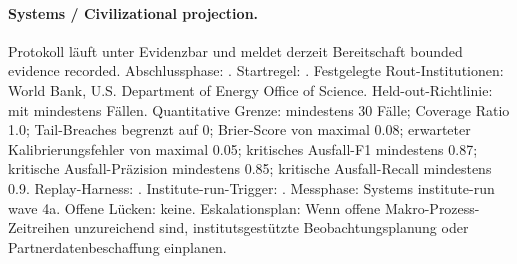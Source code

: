 \paragraph{Systems / Civilizational projection.}
Protokoll  läuft unter Evidenzbar  und meldet derzeit Bereitschaft bounded evidence recorded.
Abschlussphase: . Startregel: .
Festgelegte Rout-Institutionen: World Bank, \allowbreak U.S. Department of Energy Office of Science.
Held-out-Richtlinie:  mit mindestens  Fällen.
Quantitative Grenze: mindestens 30 Fälle; Coverage Ratio 1.0; Tail-Breaches begrenzt auf 0; Brier-Score von maximal 0.08; erwarteter Kalibrierungsfehler von maximal 0.05; kritisches Ausfall-F1 mindestens 0.87; kritische Ausfall-Präzision mindestens 0.85; kritische Ausfall-Recall mindestens 0.9.
Replay-Harness: .
Institute-run-Trigger: . Messphase: Systems institute-run wave 4a.
Offene Lücken: keine.
Eskalationsplan: Wenn offene Makro-Prozess-Zeitreihen unzureichend sind, institutsgestützte Beobachtungsplanung oder Partnerdatenbeschaffung einplanen.
